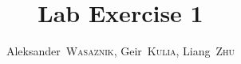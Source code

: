 \documentclass[a4,journal,twoside]{IEEEtran}
\begin{document}
\title{Lab Exercise 1}
\author{Aleksander~\textsc{Wasaznik},
		Geir~\textsc{Kulia},
        Liang~\textsc{Zhu}}


\maketitle

\begin{abstract}
\blindtext[1]
\end{abstract}



\end{document}
